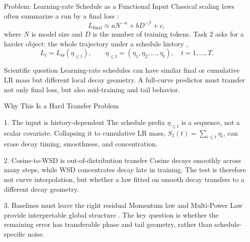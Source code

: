 \documentclass[fontset=fandol,aspectratio=169,10pt]{ctexbeamer}
\begin{document}
\begin{frame}{Problem: Learning-rate Schedule as a Functional Input}
  Classical scaling laws often summarize a run by a final loss
  \cite{bi2024deepseek,hu2024minicpm,zhang2026configuration}:
  \[
    L_{\mathrm{final}} \approx aN^{-\alpha}+bD^{-\beta}+c,
  \]
  where \(N\) is model size and \(D\) is the number of training tokens.
  Task 2 asks for a harder object: the whole trajectory under a schedule
  history \cite{li2026functional,luo2025multi,tissue2026scaling},
  \[
    L_t = L_{\Theta}(\eta_{\le t}),\qquad
    \eta_{\le t}=(\eta_1,\eta_2,\ldots,\eta_t),\quad t=1,\ldots,T .
  \]

  \vspace{0.3em}
  \begin{block}{Scientific question}
    Learning-rate schedules can have similar final or cumulative LR mass but
    different local decay geometry. A full-curve predictor must transfer not
    only final loss, but also mid-training and tail behavior.
  \end{block}
\end{frame}

\begin{frame}{Why This Is a Hard Transfer Problem}
  \begin{block}{1. The input is history-dependent}
    The schedule prefix \(\eta_{\le t}\) is a sequence, not a scalar covariate.
    Collapsing it to cumulative LR mass,
    \(S_1(t)=\sum_{i\le t}\eta_i\), can erase decay timing, smoothness, and
    concentration.
  \end{block}

  \begin{block}{2. Cosine-to-WSD is out-of-distribution transfer}
    Cosine decays smoothly across many steps, while WSD concentrates decay
    late in training. The test is therefore not curve interpolation, but
    whether a law fitted on smooth decay transfers to a different decay geometry.
  \end{block}

  \begin{block}{3. Baselines must leave the right residual}
    Momentum law and Multi-Power Law provide interpretable global structure
    \cite{luo2025multi,tissue2026scaling}.
    The key question is whether the remaining error has transferable phase and
    tail geometry, rather than schedule-specific noise.
  \end{block}
\end{frame}
\end{document}
